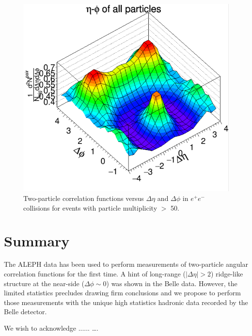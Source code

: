\documentclass[aps,prl,twocolumn,showpacs,superscriptaddress,groupedaddress]{revtex4}  %
\begin{document}
\begin{figure}[!htb]
\begin{center}
\includegraphics[width=.45\textwidth]{figure1.png}
\caption{Two-particle correlation functions versus $\Delta\eta$ and $\Delta\phi$ in $e^{+}e^{-}$ collisions for events with particle multiplicity $>$ 50.}
\label{fig:figure2} 
\end{center}
\end{figure}

\section{\label{sec:summary}Summary}
The ALEPH data has been used to perform measurements of two-particle angular correlation functions for the first time. A hint of long-range ($|\Delta\eta|>2$) ridge-like structure at the
near-side ($\Delta\phi\sim 0$) was shown in the Belle data. However, the limited statistics precludes drawing firm conclusions and we propose to perform those measurements with the unique high statistics hadronic data recorded by the Belle detector.


\begin{acknowledgments}
We wish to acknowledge ......
\dots.
\end{acknowledgments}

\nocite{*}

\end{document}
